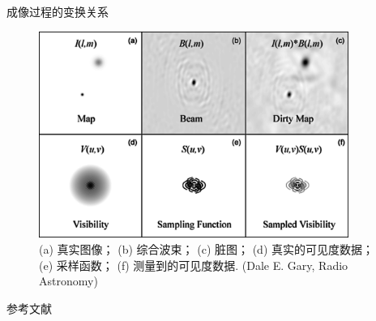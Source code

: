 \documentclass{beamer}
\begin{document}
\begin{frame}{成像过程的变换关系}
  \begin{figure}
    \centering
    \includegraphics[width=0.9\textwidth]{imaging-relations}
    \caption{%
      (a) 真实图像；
      (b) 综合波束；
      (c) 脏图；
      (d) 真实的可见度数据；
      (e) 采样函数；
      (f) 测量到的可见度数据.
      (Dale E. Gary, Radio Astronomy)
    }
  \end{figure}
\end{frame}

\begin{frame}[allowframebreaks]{参考文献}
  \printbibliography[heading=none]
\end{frame}
\end{document}
